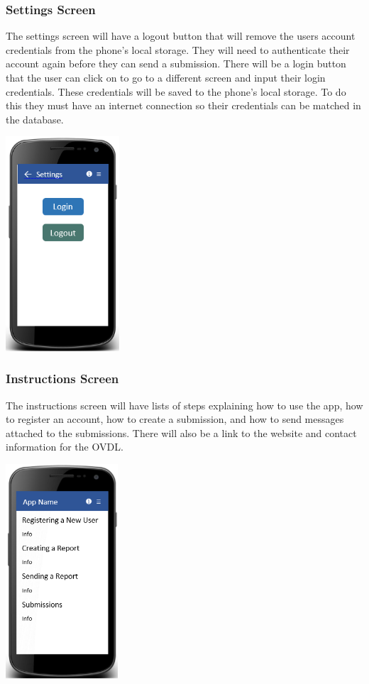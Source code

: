 \documentclass[onecolumn, draftclsnofoot,10pt, compsoc]{IEEEtran}
\begin{document}
\subsubsection{Settings Screen}
The settings screen will have a logout button that will remove the users account credentials from the phone’s local storage. They will need to authenticate their account again before they can send a submission. There will be a login button that the user can click on to go to a different screen and input their login credentials. These credentials will be saved to the phone's local storage. To do this they must have an internet connection so their credentials can be matched in the database. 
\begin{center}
\includegraphics[height=8cm]{settingsscreen.png}
\end{center}

\subsubsection{Instructions Screen}
The instructions screen will have lists of steps explaining how to use the app, how to register an account, how to create a submission, and how to send messages attached to the submissions. There will also be a link to the website and contact information for the OVDL. 
\newline
\begin{center}
\includegraphics[height=8cm]{instructionsscreen.png}
\end{center}
\end{document}
